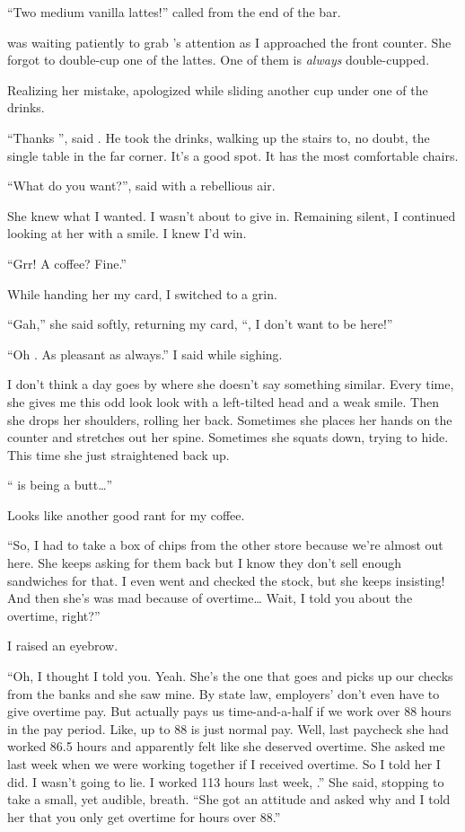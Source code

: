 ``Two medium vanilla lattes!'' \april{} called from the end of the bar.
\VV


\noindent
\dameon{} was waiting patiently to grab \april's attention
as I approached the front counter.
She forgot to double-cup one of the lattes.
One of them is \textit{always} double-cupped.
\VV


\noindent
Realizing her mistake, \april{} apologized while sliding another cup
under one of the drinks.
\VV


``Thanks \april'', said \dameon{}.
He took the drinks, walking up the stairs to, no doubt, the single table
in the far corner.  It's a good spot. It has the most comfortable chairs.
\VV


``What do you want?'', \april{} said with a rebellious air.
\VV


\noindent
She knew what I wanted. I wasn't about to give in.
Remaining silent, I continued looking at her with a smile.
I knew I'd win.
\VV


``Grr! A coffee? Fine.''
\VV


\noindent
While handing her my card, I switched to a grin.
\VV


``Gah,'' she said softly, returning my card,
``\josh, I don't want to be here!''


``Oh \april. As pleasant as always.''  I said while sighing.
\VV


\noindent
I don't think a day goes by where she doesn't say something similar.
Every time, she gives me this odd look look with a left-tilted head
and a weak smile.  Then she drops her shoulders, rolling her back.
Sometimes she places her hands on the counter and stretches out her spine.
Sometimes she squats down, trying to hide.
This time she just straightened back up.
\VV


``\jasmine{} is being a butt\ldots''
\VV


\noindent
Looks like another good rant for my coffee.
\VV


``So, I had to take a box of chips from the other store
because we're almost out here.  She keeps asking for them back
but I know they don't sell enough sandwiches for that.
I even went and checked the stock, but she keeps insisting!
And then she's was mad because of overtime\ldots{}
Wait, I told you about the overtime, right?''
\VV


I raised an eyebrow.
\VV


``Oh, I thought I told you.
Yeah. She's the one that goes and picks up our checks from the banks
and she saw mine.  By state law, employers' don't even have to
give overtime pay.  But \mike{} actually pays us time-and-a-half if
we work over 88 hours in the pay period.
Like, up to 88 is just normal pay.
Well, last paycheck she had worked 86.5 hours and apparently felt like
she deserved overtime.  She asked me last week when we were working together
if I received overtime.  So I told her I did.  I wasn't going to lie.
I worked 113 hours last week, \josh.''
She said, stopping to take a small, yet audible, breath.
``She got an attitude and asked why and I told her that you only get overtime
for hours over 88.''
\VV


